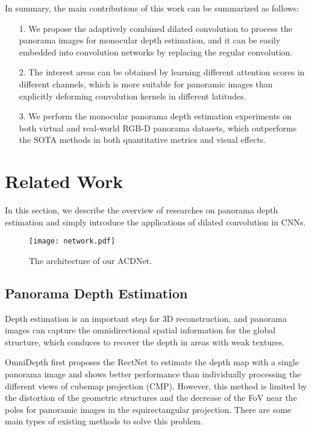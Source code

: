 \documentclass[letterpaper]{article} \usepackage{aaai21}  \usepackage{times}  \usepackage{helvet} \usepackage{courier}  \usepackage[hyphens]{url}  \usepackage{graphicx} \urlstyle{rm} \def\UrlFont{\rm}  \usepackage{natbib}  \usepackage{caption} \frenchspacing  \setlength{\pdfpagewidth}{8.5in}  \setlength{\pdfpageheight}{11in}
\begin{document}
In summary, the main contributions of this work can be summarized as follows:
\begin{itemize}
    \item[1.] We propose the adaptively combined dilated convolution to process the panorama images for monocular depth estimation, and it can be easily embedded into convolution networks by replacing the regular convolution.
    \item[2.] The interest areas can be obtained by learning different attention scores in different channels, which is more suitable for panoramic images than explicitly deforming convolution kernels in different latitudes.
    \item[3.] We perform the monocular panorama depth estimation experiments on both virtual and real-world RGB-D panorama datasets, which outperforms the SOTA methods in both quantitative metrics and visual effects.
\end{itemize}


\section{Related Work}

In this section, we describe the overview of researches on panorama depth estimation and simply introduce the applications of dilated convolution in CNNs. 

\begin{figure*}[tb]
\centering
  \texttt{[image: network.pdf]}
  \caption{The architecture of our ACDNet.}
  \label{fig:network}
\end{figure*}

\subsection{Panorama Depth Estimation}

Depth estimation is an important step for 3D reconstruction, and panorama images can capture the omnidirectional spatial information for the global structure, which conduces to recover the depth in areas with weak textures.

OmniDepth \cite{DBLP:conf/eccv/ZioulisKZD18} first proposes the RectNet to estimate the depth map with a single panorama image and shows better performance than individually processing the different views of cubemap projection (CMP). 
However, this method is limited by the distortion of the geometric structures and the decrease of the FoV near the poles for panoramic images in the equirectangular projection. There are some main types of existing methods to solve this problem.
\end{document}
